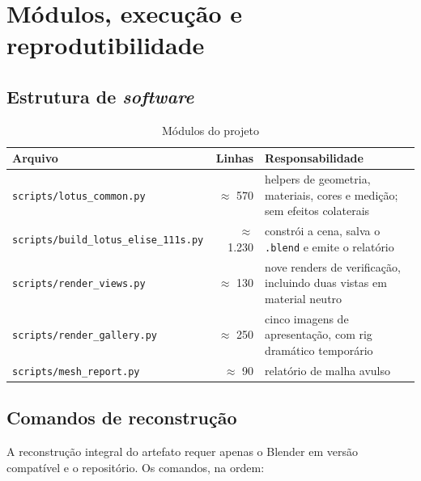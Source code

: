 \chapter{M\'odulos, execu{\c{c}}\~ao e reprodutibilidade}\label{ap:scripts}

\section{Estrutura de \emph{software}}

\begin{table}[htbp]
\centering
\caption{M\'odulos do projeto}
\label{tab:modulos-ap}
\footnotesize
\begin{tabular}{>{\raggedright\arraybackslash}p{4.4cm}r>{\raggedright\arraybackslash}p{7.6cm}}
\toprule
\textbf{Arquivo} & \textbf{Linhas} & \textbf{Responsabilidade} \\
\midrule
\texttt{scripts/lotus\_common.py} & $\approx$ 570 & helpers de geometria, materiais, cores e medi{\c{c}}\~ao; sem efeitos colaterais \\
\texttt{scripts/}\allowbreak\texttt{build\_lotus\_}\allowbreak\texttt{elise\_111s.py} & $\approx$ 1.230 & constr\'oi a cena, salva o \texttt{.blend} e emite o relat\'orio \\
\texttt{scripts/}\allowbreak\texttt{render\_views.py} & $\approx$ 130 & nove renders de verifica{\c{c}}\~ao, incluindo duas vistas em material neutro \\
\texttt{scripts/}\allowbreak\texttt{render\_gallery.py} & $\approx$ 250 & cinco imagens de apresenta{\c{c}}\~ao, com rig dram\'atico tempor\'ario \\
\texttt{scripts/mesh\_report.py} & $\approx$ 90 & relat\'orio de malha avulso \\
\bottomrule
\end{tabular}
\end{table}

\section{Comandos de reconstru{\c{c}}\~ao}

A reconstru{\c{c}}\~ao integral do artefato requer apenas o Blender em vers\~ao compat\'ivel e o
reposit\'orio. Os comandos, na ordem:

